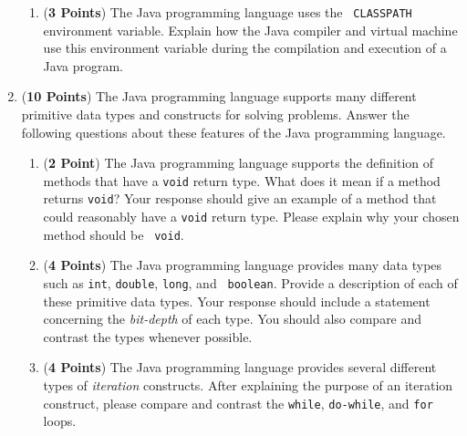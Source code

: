 \documentclass[12pt]{article}
\begin{document}
\begin{enumerate}
\begin{enumerate}
\item ({\bf 3 Points}) The Java programming language uses the {\tt
  CLASSPATH} environment variable.  Explain how the Java compiler and
  virtual machine use this environment variable during the compilation
  and execution of a Java program.

\end{enumerate}

\newpage

\item ({\bf 10 Points}) The Java programming language supports many
  different primitive data types and constructs for solving problems.
  Answer the following questions about these features of the Java
  programming language.

\begin{enumerate}

\item ({\bf 2 Point}) The Java programming language supports the
  definition of methods that have a {\tt void} return type.  What does
  it mean if a method returns {\tt void}?  Your response should give
  an example of a method that could reasonably have a {\tt void}
  return type.  Please explain why your chosen method should be {\tt
    void}.

  
\item ({\bf 4 Points}) The Java programming language provides many
  data types such as {\tt int}, {\tt double}, {\tt long}, and {\tt
    boolean}.  Provide a description of each of these primitive data
  types.  Your response should include a statement concerning the {\em
    bit-depth} of each type. You should also compare and contrast the
  types whenever possible.


\item ({\bf 4 Points}) The Java programming language provides several
  different types of {\em iteration} constructs.  After explaining the
  purpose of an iteration construct, please compare and contrast the
  {\tt while}, {\tt do-while}, and {\tt for} loops.


\end{enumerate}
\end{enumerate}
\end{document}
